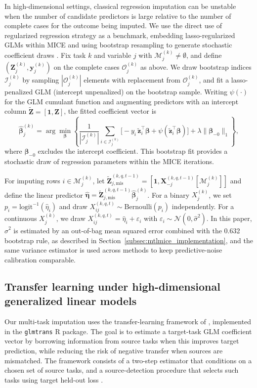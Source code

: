 \documentclass[12pt]{article}
\begin{document}
In high-dimensional settings, classical regression imputation can be unstable when the number of candidate predictors is large relative to
the number of complete cases for the outcome being imputed. We use the direct use of regularized regression strategy as a benchmark,
embedding lasso-regularized GLMs within MICE and using bootstrap resampling to generate stochastic coefficient draws \citep{deng_multiple_2016}.
Fix task $k$ and variable $j$ with $\mathcal{M}^{(k)}_j\neq\emptyset$, and define $(\bm{Z}^{(k)}_j,\bm{y}^{(k)}_j)$ on the complete cases
$\mathcal{O}^{(k)}_j$ as above. We draw bootstrap indices $\mathcal{I}^{(k)}_j$ by sampling $|\mathcal{O}^{(k)}_j|$ elements with replacement
from $\mathcal{O}^{(k)}_j$, and fit a lasso-penalized GLM (intercept unpenalized) on the bootstrap sample. Writing $\psi(\cdot)$ for the GLM
cumulant function and augmenting predictors with an intercept column $\tilde{\bm{Z}}=[\bm{1},\bm{Z}]$, the fitted coefficient vector is
\[
\hat{\bm{\beta}}^{(k)}_j
=\arg\min_{\bm{\beta}}
\left\{
\frac{1}{|\mathcal{I}^{(k)}_j|}
\sum_{i\in\mathcal{I}^{(k)}_j}\big[-y_i\,\tilde{\bm{z}}_i^\top\bm{\beta}+\psi(\tilde{\bm{z}}_i^\top\bm{\beta})\big]
+\lambda\|\bm{\beta}_{-0}\|_1
\right\},
\]
where $\bm{\beta}_{-0}$ excludes the intercept coefficient. This bootstrap fit provides a stochastic draw of regression parameters within the
MICE iterations.

For imputing rows $i\in\mathcal{M}^{(k)}_j$, let $\tilde{\bm{Z}}^{(k,q,t-1)}_{j,\mathrm{mis}}=[\bm{1},\bm{X}^{(k,q,t-1)}_{-j}[\mathcal{M}^{(k)}_j]]$
and define the linear predictor $\hat{\bm{\eta}}=\tilde{\bm{Z}}^{(k,q,t-1)}_{j,\mathrm{mis}}\hat{\bm{\beta}}^{(k)}_j$.
For a binary $X^{(k)}_j$, we set $p_i=\mathrm{logit}^{-1}(\hat{\eta}_i)$ and draw $X^{(k,q,t)}_{ij}\sim\mathrm{Bernoulli}(p_i)$ independently.
For a continuous $X^{(k)}_j$, we draw $X^{(k,q,t)}_{ij}=\hat{\eta}_i+\varepsilon_i$ with $\varepsilon_i\sim\mathcal{N}(0,\hat{\sigma}^2)$.
In this paper, $\hat{\sigma}^2$ is estimated by an out-of-bag mean squared error combined with the 0.632 bootstrap rule, as described in
Section~\ref{subsec:mtlmice_implementation}, and the same variance estimator is used across methods to keep predictive-noise calibration comparable.

\subsection{Transfer learning under high-dimensional generalized linear models}
\label{subsec:glmtrans}
Our multi-task imputation uses the transfer-learning framework of \citet{tian_transfer_2022}, implemented in the \texttt{glmtrans} R package.
The goal is to estimate a target-task GLM coefficient vector by borrowing information from source tasks when this improves target prediction,
while reducing the risk of negative transfer when sources are mismatched. The framework consists of a two-step estimator that conditions on a
chosen set of source tasks, and a source-detection procedure that selects such tasks using target held-out loss \citep{tian_transfer_2022}.
\end{document}
